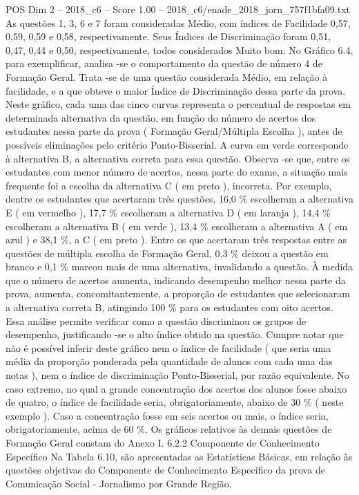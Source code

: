 \begin{textsample}{POS Dim 2 – 2018\_c6 – Score 1.00 – 2018\_c6/enade\_2018\_jorn\_757f1bfa09.txt}
As questões 1, 3, 6 e 7 foram consideradas Médio, com índices de Facilidade 0,57, 0,59, 0,59 e 0,58, respectivamente.
Seus Índices de Discriminação foram 0,51, 0,47, 0,44 e 0,50, respectivamente, todos considerados Muito bom.
No Gráfico 6.4, para exemplificar, analisa -se o comportamento da questão de número 4 de Formação Geral.
Trata -se de uma questão considerada Médio, em relação à facilidade, e a que obteve o maior Índice de Discriminação dessa parte da prova.
Neste gráfico, cada uma das cinco curvas representa o percentual de respostas em determinada alternativa da questão, em função do número de acertos dos estudantes nessa parte da prova ( Formação Geral/Múltipla Escolha ), antes de possíveis eliminações pelo critério Ponto-Bisserial.
A curva em verde corresponde à alternativa B, a alternativa correta para essa questão.
Observa -se que, entre os estudantes com menor número de acertos, nessa parte do exame, a situação mais frequente foi a escolha da alternativa C ( em preto ), incorreta.
Por exemplo, dentre os estudantes que acertaram três questões, 16,0 \% escolheram a alternativa E ( em vermelho ), 17,7 \% escolheram a alternativa D ( em laranja ), 14,4 \% escolheram a alternativa B ( em verde ), 13,4 \% escolheram a alternativa A ( em azul ) e 38,1 \%, a C ( em preto ).
Entre os que acertaram três respostas entre as questões de múltipla escolha de Formação Geral, 0,3 \% deixou a questão em branco e 0,1 \% marcou mais de uma alternativa, invalidando a questão.
À medida que o número de acertos aumenta, indicando desempenho melhor nessa parte da prova, aumenta, concomitantemente, a proporção de estudantes que selecionaram a alternativa correta B, atingindo 100 \% para os estudantes com oito acertos.
Essa análise permite verificar como a questão discriminou os grupos de desempenho, justificando -se o alto índice obtido na questão.
Cumpre notar que não é possível inferir deste gráfico nem o índice de facilidade ( que seria uma média da proporção ponderada pela quantidade de alunos com cada uma das notas ), nem o índice de discriminação Ponto-Bisserial, por razão equivalente.
No caso extremo, no qual a grande concentração dos acertos dos alunos fosse abaixo de quatro, o índice de facilidade seria, obrigatoriamente, abaixo de 30 \% ( neste exemplo ).
Caso a concentração fosse em seis acertos ou mais, o índice seria, obrigatoriamente, acima de 60 \%.
Os gráficos relativos às demais questões de Formação Geral constam do Anexo I. 6.2.2 Componente de Conhecimento Específico Na Tabela 6.10, são apresentadas as Estatísticas Básicas, em relação às questões objetivas do Componente de Conhecimento Específico da prova de Comunicação Social - Jornalismo por Grande Região.

\end{textsample}
